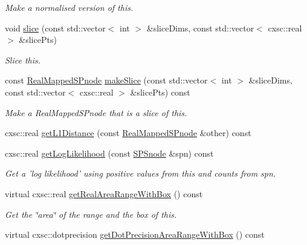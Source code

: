 \begin{DoxyCompactItemize}
\begin{DoxyCompactList}\small\item\em \-Make a normalised version of this. \end{DoxyCompactList}\item 
void \hyperlink{classsubpavings_1_1RealMappedSPnode_ac674f3231fb03622048986a2a855b224}{slice} (const std\-::vector$<$ int $>$ \&slice\-Dims, const std\-::vector$<$ cxsc\-::real $>$ \&slice\-Pts)
\begin{DoxyCompactList}\small\item\em \-Slice this. \end{DoxyCompactList}\item 
const \hyperlink{classsubpavings_1_1RealMappedSPnode}{\-Real\-Mapped\-S\-Pnode} \hyperlink{classsubpavings_1_1RealMappedSPnode_a2541f9ce5af2fcb753644d1f7e1f9297}{make\-Slice} (const std\-::vector$<$ int $>$ \&slice\-Dims, const std\-::vector$<$ cxsc\-::real $>$ \&slice\-Pts) const 
\begin{DoxyCompactList}\small\item\em \-Make a \-Real\-Mapped\-S\-Pnode that is a slice of this. \end{DoxyCompactList}\item 
cxsc\-::real \hyperlink{classsubpavings_1_1RealMappedSPnode_af243ad67d0ff141d345e800b651a87e1}{get\-L1\-Distance} (const \hyperlink{classsubpavings_1_1RealMappedSPnode}{\-Real\-Mapped\-S\-Pnode} \&other) const 
\item 
cxsc\-::real \hyperlink{classsubpavings_1_1RealMappedSPnode_a116f7a6b92d5c442be9d8393b6e0e73f}{get\-Log\-Likelihood} (const \hyperlink{classsubpavings_1_1SPSnode}{\-S\-P\-Snode} \&spn) const 
\begin{DoxyCompactList}\small\item\em \-Get a 'log likelihood' using positive values from this and counts from {\itshape spn\/}. \end{DoxyCompactList}\item 
virtual cxsc\-::real \hyperlink{classsubpavings_1_1RealMappedSPnode_a153b19ceeba356f0ada4e27dfcf6ab37}{get\-Real\-Area\-Range\-With\-Box} () const 
\begin{DoxyCompactList}\small\item\em \-Get the \char`\"{}area\char`\"{} of the range and the box of this. \end{DoxyCompactList}\item 
virtual cxsc\-::dotprecision \hyperlink{classsubpavings_1_1RealMappedSPnode_a8f083e792f8980eec67298253428c5c9}{get\-Dot\-Precision\-Area\-Range\-With\-Box} () const 

\end{DoxyCompactItemize}
